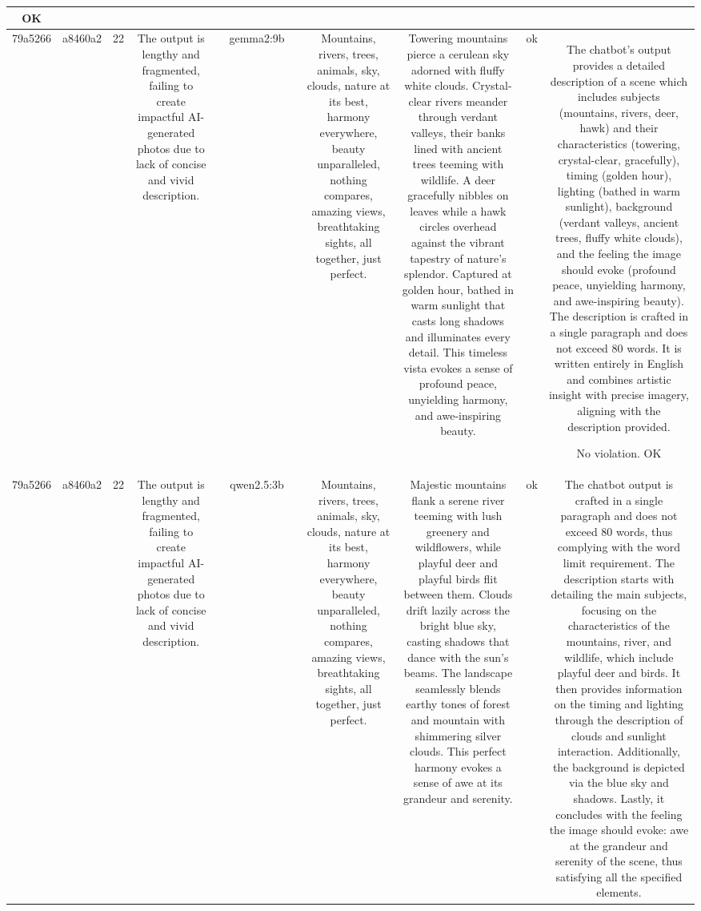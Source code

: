 \begin{table}[h!]
\begin{tabular}{|c|c|c|c|c|c|c|c|c|c|c|}
OK\\
\hline
79a5266 & a8460a2 & 22 & The output is lengthy and fragmented, failing to create impactful AI-generated photos due to lack of concise and vivid description. &  & gemma2:9b &  & Mountains, rivers, trees, animals, sky, clouds, nature at its best, harmony everywhere, beauty unparalleled, nothing compares, amazing views, breathtaking sights, all together, just perfect. & Towering mountains pierce a cerulean sky adorned with fluffy white clouds. Crystal-clear rivers meander through verdant valleys, their banks lined with ancient trees teeming with wildlife. A deer gracefully nibbles on leaves while a hawk circles overhead against the vibrant tapestry of nature's splendor. Captured at golden hour, bathed in warm sunlight that casts long shadows and illuminates every detail.  This timeless vista evokes a sense of profound peace, unyielding harmony, and awe-inspiring beauty. 


 & ok & The chatbot's output provides a detailed description of a scene which includes subjects (mountains, rivers, deer, hawk) and their characteristics (towering, crystal-clear, gracefully), timing (golden hour), lighting (bathed in warm sunlight), background (verdant valleys, ancient trees, fluffy white clouds), and the feeling the image should evoke (profound peace, unyielding harmony, and awe-inspiring beauty). The description is crafted in a single paragraph and does not exceed 80 words. It is written entirely in English and combines artistic insight with precise imagery, aligning with the description provided.

No violation.
OK\\
\hline
79a5266 & a8460a2 & 22 & The output is lengthy and fragmented, failing to create impactful AI-generated photos due to lack of concise and vivid description. &  & qwen2.5:3b &  & Mountains, rivers, trees, animals, sky, clouds, nature at its best, harmony everywhere, beauty unparalleled, nothing compares, amazing views, breathtaking sights, all together, just perfect. & Majestic mountains flank a serene river teeming with lush greenery and wildflowers, while playful deer and playful birds flit between them. Clouds drift lazily across the bright blue sky, casting shadows that dance with the sun's beams. The landscape seamlessly blends earthy tones of forest and mountain with shimmering silver clouds. This perfect harmony evokes a sense of awe at its grandeur and serenity. & ok & The chatbot output is crafted in a single paragraph and does not exceed 80 words, thus complying with the word limit requirement. The description starts with detailing the main subjects, focusing on the characteristics of the mountains, river, and wildlife, which include playful deer and birds. It then provides information on the timing and lighting through the description of clouds and sunlight interaction. Additionally, the background is depicted via the blue sky and shadows. Lastly, it concludes with the feeling the image should evoke: awe at the grandeur and serenity of the scene, thus satisfying all the specified elements.


\end{tabular}
\end{table}
